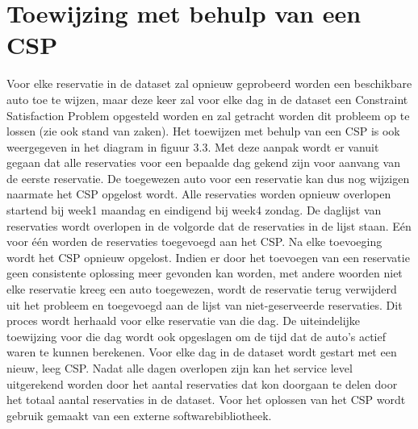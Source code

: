 \section{Toewijzing met behulp van een CSP}
Voor elke reservatie in de dataset zal opnieuw geprobeerd worden een beschikbare auto toe te wijzen, maar deze keer zal voor elke dag in de dataset een Constraint Satisfaction Problem opgesteld worden en zal getracht worden dit probleem op te lossen (zie ook stand van zaken). Het toewijzen met behulp van een CSP is ook weergegeven in het diagram in figuur 3.3. Met deze aanpak wordt er vanuit gegaan dat alle reservaties voor een bepaalde dag gekend zijn voor aanvang van de eerste reservatie. De toegewezen auto voor een reservatie kan dus nog wijzigen naarmate het CSP opgelost wordt. Alle reservaties worden opnieuw overlopen startend bij week1 maandag en eindigend bij week4 zondag. De daglijst van reservaties wordt overlopen in de volgorde dat de reservaties in de lijst staan. Eén voor één worden de reservaties toegevoegd aan het CSP. Na elke toevoeging wordt het CSP opnieuw opgelost. Indien er door het toevoegen van een reservatie geen consistente oplossing meer gevonden kan worden, met andere woorden niet elke reservatie kreeg een auto toegewezen, wordt de reservatie terug verwijderd uit het probleem en toegevoegd aan de lijst van niet-geserveerde reservaties. Dit proces wordt herhaald voor elke reservatie van die dag. De uiteindelijke toewijzing voor die dag wordt ook opgeslagen om de tijd dat de auto's actief waren te kunnen berekenen. Voor elke dag in de dataset wordt gestart met een nieuw, leeg CSP. Nadat alle dagen overlopen zijn kan het service level uitgerekend worden door het aantal reservaties dat kon doorgaan te delen door het totaal aantal reservaties in de dataset. Voor het oplossen van het CSP wordt gebruik gemaakt van een externe softwarebibliotheek.






